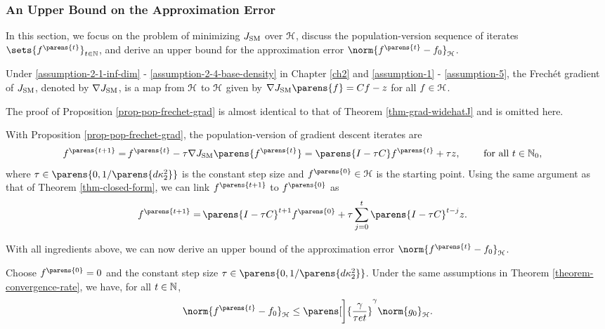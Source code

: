 \subsubsection{An Upper Bound on the Approximation Error}

In this section, we focus on the problem of minimizing $J_{\mathrm{SM}}$ over $\mathcal{H}$, discuss the population-version sequence of iterates $\sets{f^{\parens{t}}}_{t \in \Natural}$, and derive an upper bound for the approximation error $\norm{f^{\parens{t}} - f_0}_{\calH}$. 

\begin{proposition}\label{prop-pop-frechet-grad}
	Under \ref{assumption-2-1-inf-dim} - \ref{assumption-2-4-base-density} in Chapter \ref{ch2} and \ref{assumption-1} - \ref{assumption-5}, the Frech{\'e}t gradient of $J_{\mathrm{SM}}$, denoted by $\nabla J_{\mathrm{SM}}$, is a map from $\mathcal{H}$ to $\mathcal{H}$ given by $\nabla J_{\SM} \parens{f} = C f - z$ for all $f \in \mathcal{H}$. 
\end{proposition}

The proof of Proposition \ref{prop-pop-frechet-grad} is almost identical to that of Theorem \ref{thm-grad-widehatJ} and is omitted here. 

With Proposition \ref{prop-pop-frechet-grad}, the population-version of gradient descent iterates are 
\begin{align*}
	f^{\parens{t+1}} = & \, f^{\parens{t}} - \tau \nabla J_{\SM} \parens{f^{\parens{t}}} 
	= \parens{I - \tau C} f^{\parens{t}} + \tau z, \qquad \text{ for all } t \in \Natural_0, 
\end{align*}
where $\tau \in \parens{0, 1 / \parens{d \kappa_2^2}}$ is the constant step size and $f^{\parens{0}} \in \hil$ is the starting point. Using the same argument as that of Theorem \ref{thm-closed-form}, we can link $f^{\parens{t+1}}$ to $f^{\parens{0}}$ as
\begin{align*}%
	f^{\parens{t+1}} = & \, \parens{I - \tau C}^{t+1} f^{\parens{0}} + \tau \sum_{j=0}^t \parens{I - \tau C}^{t - j} z. 
\end{align*}

With all ingredients above, we can now derive an upper bound of the approximation error $\norm{f^{\parens{t}} - f_0}_{\hil}$. 

\begin{theorem}\label{theorem-approx-error}
	Choose $f^{\parens{0}} = 0$ and the constant step size $\tau \in \parens{0, 1 / \parens{d \kappa_2^2}}$. Under the same assumptions in Theorem \ref{theorem-convergence-rate}, we have, for all $t \in \mathbb{N}$, 
	\begin{align*}
		\norm{f^{\parens{t}} - f_0}_{\calH} \le \parens[\bigg]{\frac{\gamma}{\tau e t}}^{\gamma} \norm{g_0}_{\hil}. 
	\end{align*}
\end{theorem}

